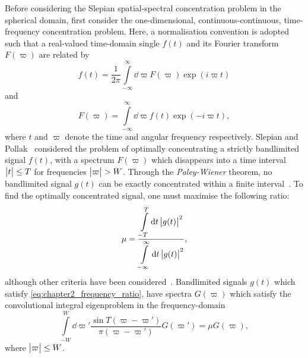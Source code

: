 Before considering the Slepian spatial-spectral concentration problem in the spherical domain, first consider the one-dimensional, continuous-continuous, time-frequency concentration problem.
Here, a normalisation convention is adopted such that a real-valued time-domain single \(f(t)\) and its Fourier transform \(F(\varpi)\) are related by
%
\begin{equation}
	f(t)
	= \frac{1}{2\pi} \int\limits_{-\infty}^{\infty} \dd{\varpi} F(\varpi) \exp(i\varpi t)
\end{equation}
%
and
%
\begin{equation}
	F(\varpi)
	= \int\limits_{-\infty}^{\infty} \dd{\varpi} f(t) \exp(-i\varpi t),
\end{equation}
%
where \(t\) and \(\varpi{}\) denote the time and angular frequency respectively.
Slepian and Pollak~\cite{Slepian1961} considered the problem of optimally concentrating a strictly bandlimited signal \(f(t)\), with a spectrum \(F(\varpi)\) which disappears into a time interval \(\big\lvert t\big\rvert \leq T\) for frequencies \(\big\lvert\varpi\big\rvert > W\).
Through the \emph{Paley-Wiener} theorem, no bandlimited signal \(g(t)\) can be exactly concentrated within a finite interval~\cite{Daubechies1992,Mallat2008}.
To find the optimally concentrated signal, one must maximise the following ratio:
%
\begin{equation}\label{eq:chapter2_frequency_ratio}
	\mu
	= \frac{\displaystyle\int\limits_{-T}^{T} \dd{t} \big\lvert g(t)\big\rvert^{2}}
	{\displaystyle\int\limits_{-\infty}^{\infty} \dd{t} \big\lvert g(t)\big\rvert^{2}},
\end{equation}
%
although other criteria have been considered~\cite{Freeden1997,Riedel1995}.
Bandlimited signals \(g(t)\) which satisfy \cref{eq:chapter2_frequency_ratio}, have spectra \(G(\varpi)\) which satisfy the convolutional integral eigenproblem in the frequency-domain
%
\begin{equation}\label{eq:chapter2_frequency_eigenproblem}
	\int\limits_{-W}^{W} \dd{\varpi'} \frac{\sin{T(\varpi-\varpi')}}{\pi(\varpi-\varpi')} G(\varpi')
	= \mu G(\varpi),
\end{equation}
%
where \(\big\lvert\varpi\big\rvert \leq W\).


